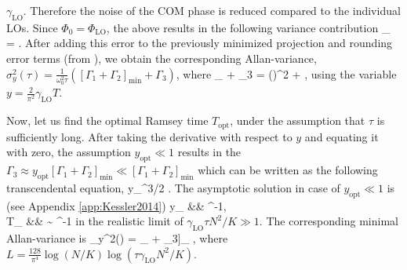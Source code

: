$\gamma_\mathrm{LO}$. Therefore the noise of the COM phase is reduced
compared to the individual LOs. Since $\Phi_0 = \Phi_\mathrm{LO}$, the above
results in the following variance contribution
\bel
	\label{eq:Slip_GHZ 2}
	_ =
	\sqrt{32\pi} 
	\exp{}.
\eel
After adding this error to the previously minimized projection and rounding
error terms (from ), we obtain the corresponding
Allan-variance, $\sigma_y^2(\tau) =\frac{1}{\omega_0^2\tau}\left([\Gamma_1 + \Gamma_2]_\mathrm{min} +
\Gamma_3\right)$, where 
{}_ + \Gamma_3 =
	\left(\right)^2
	 +
	\exp{},
\eel
using the variable $y = \frac{2}{\pi^2}\gamma_\mathrm{LO}T$. 

Now, let us find the optimal
Ramsey time $T_\mathrm{opt}$, under the assumption that $\tau$ is sufficiently
long.
After taking the
derivative with respect to $y$ and equating it with zero, the assumption $y_\mathrm{opt}\ll
1$ results in the $\Gamma_3 \approx y_\mathrm{opt}[\Gamma_1 +
\Gamma_2]_\mathrm{min} \ll [\Gamma_1 +
\Gamma_2]_\mathrm{min}$ which can be written as the following transcendental
equation,
\bel
	y_^{3/2} \approx
	\exp{}.
\eel
The asymptotic solution in case of $y_\mathrm{opt}\ll 1$ is (see Appendix
\ref{app:Kessler2014})
\bal
	y_ &\approx&
	^{-1},
	\\
	\label{eq:T_op_GHZ 2}
	T_ &\approx& 
	\sim
	^{-1}
\eal
in the realistic limit of $\gamma_\mathrm{LO}\tau N^2/K \gg 1$. The corresponding
minimal Allan-variance is
\bel
	\label{eq:long_tau}
	\sigma_y^2(\tau) = \Big[[\Gamma_1 +
	\Gamma_2]_ + \Gamma_3\Big]_ \approx
	,
\eel
where $L =
\frac{128}{\pi^4}\log(N/K)\log(\tau\gamma_\mathrm{LO}N^2/K)$.

